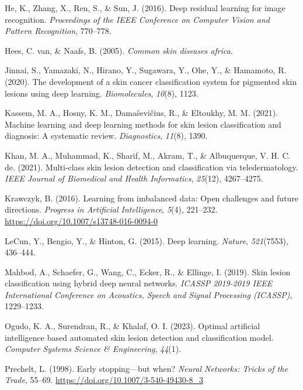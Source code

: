 \documentclass[
  12pt,
  oneside]{article}
\newlength{\cslhangindent}
\newenvironment{CSLReferences}[2] %
 {\begin{list}{}{%
  \setlength{\itemindent}{0pt}
  \setlength{\leftmargin}{0pt}
  \setlength{\parsep}{0pt}
  \ifodd #1
   \setlength{\leftmargin}{\cslhangindent}
   \setlength{\itemindent}{-1\cslhangindent}
  \fi
  \setlength{\itemsep}{#2\baselineskip}}}
 {\end{list}}
\begin{document}
\begin{CSLReferences}{1}{0}
He, K., Zhang, X., Ren, S., \& Sun, J. (2016). Deep residual learning
for image recognition. \emph{Proceedings of the IEEE Conference on
Computer Vision and Pattern Recognition}, 770--778.

Hees, C. van, \& Naafs, B. (2005). \emph{Common skin diseases africa}.

Jinnai, S., Yamazaki, N., Hirano, Y., Sugawara, Y., Ohe, Y., \&
Hamamoto, R. (2020). The development of a skin cancer classification
system for pigmented skin lesions using deep learning.
\emph{Biomolecules}, \emph{10}(8), 1123.

Kassem, M. A., Hosny, K. M., Damaševičius, R., \& Eltoukhy, M. M.
(2021). Machine learning and deep learning methods for skin lesion
classification and diagnosis: A systematic review. \emph{Diagnostics},
\emph{11}(8), 1390.

Khan, M. A., Muhammad, K., Sharif, M., Akram, T., \& Albuquerque, V. H.
C. de. (2021). Multi-class skin lesion detection and classification via
teledermatology. \emph{IEEE Journal of Biomedical and Health
Informatics}, \emph{25}(12), 4267--4275.

Krawczyk, B. (2016). Learning from imbalanced data: Open challenges and
future directions. \emph{Progress in Artificial Intelligence},
\emph{5}(4), 221--232. \url{https://doi.org/10.1007/s13748-016-0094-0}

LeCun, Y., Bengio, Y., \& Hinton, G. (2015). Deep learning.
\emph{Nature}, \emph{521}(7553), 436--444.

Mahbod, A., Schaefer, G., Wang, C., Ecker, R., \& Ellinge, I. (2019).
Skin lesion classification using hybrid deep neural networks.
\emph{ICASSP 2019-2019 IEEE International Conference on Acoustics,
Speech and Signal Processing (ICASSP)}, 1229--1233.

Ogudo, K. A., Surendran, R., \& Khalaf, O. I. (2023). Optimal artificial
intelligence based automated skin lesion detection and classification
model. \emph{Computer Systems Science \& Engineering}, \emph{44}(1).

Prechelt, L. (1998). Early stopping---but when? \emph{Neural Networks:
Tricks of the Trade}, 55--69.
\url{https://doi.org/10.1007/3-540-49430-8_3}


\end{CSLReferences}
\end{document}
